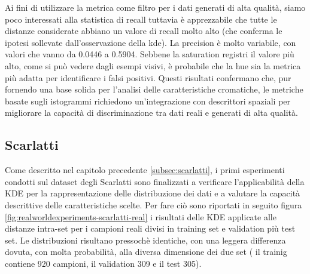 \begin{table}[h!]
    \label{tab:metriche}
    \centering
    \caption{FPR* = False Positive Rate, FNR* = False Negative Rate}
\end{table}

Ai fini di utilizzare la metrica come filtro per i dati generati di alta qualità, siamo poco interessati alla statistica di recall tuttavia è apprezzabile che tutte le distanze considerate abbiano un valore di recall molto alto (che conferma le ipotesi sollevate dall'osservazione della kde).
La precision è molto variabile, con valori che vanno da 0.0446 a 0.5904. Sebbene la saturation registri il valore più alto, come si può vedere dagli esempi visivi, è probabile che la hue sia la metrica più adatta per identificare i falsi positivi.
Questi risultati confermano che, pur fornendo una base solida per l'analisi delle caratteristiche cromatiche, le metriche basate sugli istogrammi richiedono un'integrazione con descrittori spaziali per migliorare la capacità di discriminazione tra dati reali e generati di alta qualità.

\subsection{Scarlatti}

Come descritto nel capitolo precedente \ref{subsec:scarlatti}, i primi esperimenti condotti sul dataset degli Scarlatti sono finalizzati a verificare l'applicabilità della KDE per la rappresentazione delle distribuzione dei dati e a valutare la capacità descrittive delle caratteristiche scelte.
Per fare ciò sono riportati in seguito figura \ref{fig:realworldexperiments-scarlatti-real} i risultati delle KDE applicate alle distanze intra-set per i campioni reali divisi in training set e validation più test set.
Le distribuzioni risultano pressochè identiche, con una leggera differenza dovuta, con molta probabilità, alla diversa dimensione dei due set ( il trainig contiene 920 campioni, il validation 309 e il test 305).

